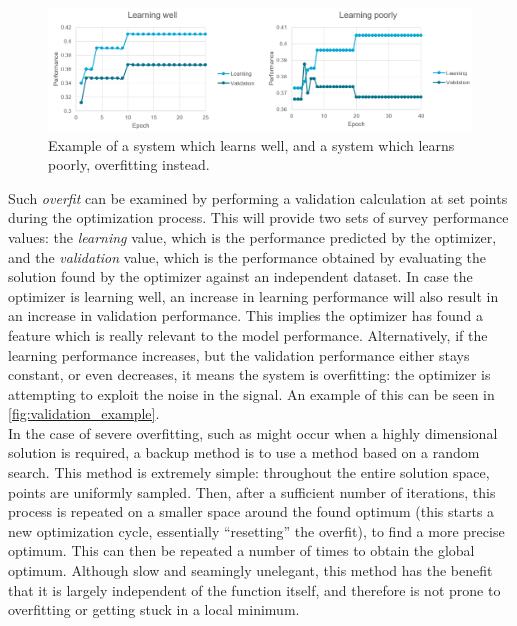 \begin{figure}[htbp]
 \centering
 \includegraphics[width=1.0\textwidth]{img/validation_example.png}
 \caption{Example of a system which learns well, and a system which learns poorly, overfitting instead.}
 \label{fig:validation_example}
\end{figure}

Such \textit{overfit} can be examined by performing a validation calculation at set points during the optimization process. This will provide two sets of survey performance values: the \textit{learning} value, which is the performance predicted by the optimizer, and the \textit{validation} value, which is the performance obtained by evaluating the solution found by the optimizer against an independent dataset. In case the optimizer is learning well, an increase in learning performance will also result in an increase in validation performance. This implies the optimizer has found a feature which is really relevant to the model performance. Alternatively, if the learning performance increases, but the validation performance either stays constant, or even decreases, it means the system is overfitting: the optimizer is attempting to exploit the noise in the signal. An example of this can be seen in \autoref{fig:validation_example}.\\


In the case of severe overfitting, such as might occur when a highly dimensional solution is required, a backup method is to use a method based on a random search. This method is extremely simple: throughout the entire solution space, points are uniformly sampled. Then, after a sufficient number of iterations, this process is repeated on a smaller space around the found optimum (this starts a new optimization cycle, essentially ``resetting'' the overfit), to find a more precise optimum. This can then be repeated a number of times to obtain the global optimum. Although slow and seamingly unelegant, this method has the benefit that it is largely independent of the function itself, and therefore is not prone to overfitting or getting stuck in a local minimum.

